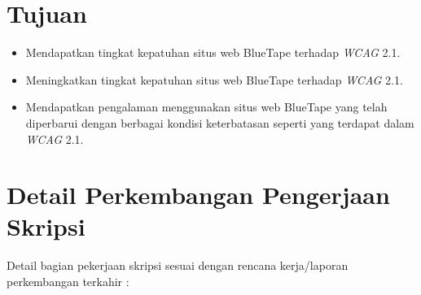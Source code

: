 \documentclass[a4paper,twoside]{article}
\begin{document}
\section{Tujuan}
\begin{itemize}
	\item Mendapatkan tingkat kepatuhan situs web BlueTape terhadap \textit{WCAG} 2.1.
	\item Meningkatkan tingkat kepatuhan situs web BlueTape terhadap \textit{WCAG} 2.1.
	\item Mendapatkan pengalaman menggunakan situs web BlueTape yang telah diperbarui dengan berbagai kondisi keterbatasan seperti yang terdapat dalam \textit{WCAG} 2.1.
\end{itemize}

\section{Detail Perkembangan Pengerjaan Skripsi}
Detail bagian pekerjaan skripsi sesuai dengan rencana kerja/laporan perkembangan terkahir :
\end{document}
